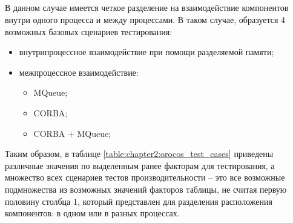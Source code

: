 \subsection{\orocos{}}
В данном случае имеется четкое разделение на взаимодействие компонентов внутри одного процесса и между процессами. В таком случае, образуется 4 возможных базовых сценариев тестирования:
\begin{itemize}[noitemsep]
	\item внутрипроцессное взаимодействие при помощи разделяемой памяти;
	\item межпроцессное взаимодействие:
	\begin{itemize}[noitemsep]
		\item MQueue;
		\item CORBA;
		\item CORBA + MQueue;
	\end{itemize}	
\end{itemize}
Таким образом, в таблице \ref{table:chapter2:orocos_test_cases} приведены различные значения по выделенным ранее факторам для тестирования, а множество всех сценариев тестов производительности -- это все возможные подмножества из возможных значений факторов таблицы, не считая первую половину столбца 1, который представлен для разделения расположения компонентов: в одном или в разных процессах.
